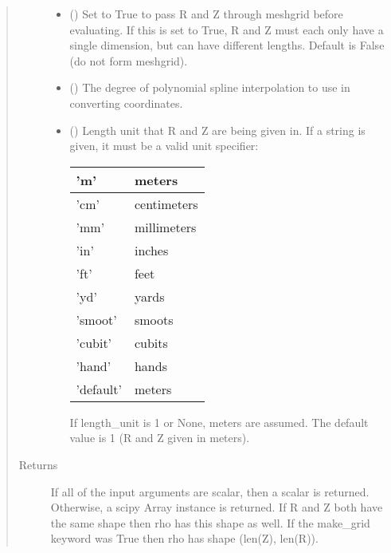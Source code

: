 \documentclass[letterpaper,10pt,english]{sphinxmanual}
\begin{document}
\begin{fulllineitems}
\begin{fulllineitems}
\begin{quote}
\begin{description}
\begin{itemize}
\item {} 
 () \textendash{} Set to True to pass R and Z through meshgrid
before evaluating. If this is set to True, R and Z must each
only have a single dimension, but can have different lengths.
Default is False (do not form meshgrid).

\item {} 
 () \textendash{} The degree of polynomial spline interpolation to
use in converting coordinates.

\item {} 
 () \textendash{} 
Length unit that R and Z are being given
in. If a string is given, it must be a valid unit specifier:


\begin{savenotes}\sphinxattablestart
\centering
\begin{tabulary}{\linewidth}[t]{|T|T|}
\hline

’m’
&
meters
\\
\hline
’cm’
&
centimeters
\\
\hline
’mm’
&
millimeters
\\
\hline
’in’
&
inches
\\
\hline
’ft’
&
feet
\\
\hline
’yd’
&
yards
\\
\hline
’smoot’
&
smoots
\\
\hline
’cubit’
&
cubits
\\
\hline
’hand’
&
hands
\\
\hline
’default’
&
meters
\\
\hline
\end{tabulary}
\par
\sphinxattableend\end{savenotes}

If length\_unit is 1 or None, meters are assumed. The default
value is 1 (R and Z given in meters).


\end{itemize}

\item[{Returns}] \leavevmode
If all of the input arguments are
scalar, then a scalar is returned. Otherwise, a scipy Array
instance is returned. If R and Z both have the same shape then
rho has this shape as well. If the make\_grid keyword was True
then rho has shape (len(Z), len(R)).


\end{description}
\end{quote}
\end{fulllineitems}
\end{fulllineitems}
\end{document}
